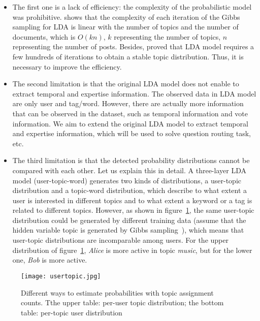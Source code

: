 \begin{itemize}
\item The first one is a lack of efficiency: the complexity of the probabilistic model was prohibitive. \cite{chp7ldatimecomplexity} shows that the complexity of each iteration of the Gibbs sampling for LDA is linear with the number of topics and the number of documents, which is $O(kn)$, $k$ representing the number of topics, $n$ representing the number of posts. Besides, \cite{griffiths2004finding} proved that LDA model requires a few hundreds of iterations to obtain a stable topic distribution. Thus, it is necessary to improve the efficiency.

\item The second limitation is that the original LDA model does not enable to extract temporal and expertise information. The observed data in LDA model are only user and tag/word. However, there are actually more information that can be observed in the dataset, such as temporal information and vote information. We aim to extend the original LDA model to extract temporal and expertise information, which will be used to solve question routing task, etc.

\item The third limitation is that the detected probability distributions cannot be compared with each other.  Let us explain this in detail. A three-layer LDA model (user-topic-word) generates two kinds of distributions, a user-topic distribution and a topic-word distribution, which describe to what extent a user is interested in different topics and to what extent a keyword or a tag is related to different topics. 
However, as shown in figure~\ref{fig:usertopic}, the same user-topic distribution could be generated by different training data (assume that the hidden variable topic is generated by Gibbs sampling~\cite{griffiths2004finding}), which means that user-topic distributions are incomparable among users. For the upper distribution of figure~\ref{fig:usertopic}, \emph{Alice} is more active in topic \emph{music}, but for the lower one, \emph{Bob} is more active. 

\end{itemize}

\begin{figure}
\centering
\texttt{[image: usertopic.jpg]}  
\caption{Different ways to estimate probabilities with topic assignment counts. Tthe upper table: per-user topic distribution; the bottom table: per-topic user distribution}
\label{fig:usertopic} 
\end{figure}


